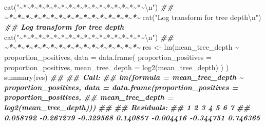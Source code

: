 \documentclass[
  11pt,
  oneside]{book}
\newenvironment{Shaded}{\begin{snugshade}}{\end{snugshade}}
\newcommand{\AttributeTok}[1]{\textcolor[rgb]{0.77,0.63,0.00}{#1}}
\newcommand{\DocumentationTok}[1]{\textcolor[rgb]{0.56,0.35,0.01}{\textbf{\textit{#1}}}}
\newcommand{\FunctionTok}[1]{\textcolor[rgb]{0.00,0.00,0.00}{#1}}
\newcommand{\NormalTok}[1]{#1}
\newcommand{\OtherTok}[1]{\textcolor[rgb]{0.56,0.35,0.01}{#1}}
\newcommand{\SpecialCharTok}[1]{\textcolor[rgb]{0.00,0.00,0.00}{#1}}
\newcommand{\StringTok}[1]{\textcolor[rgb]{0.31,0.60,0.02}{#1}}
\begin{document}
\begin{Shaded}
\begin{Highlighting}[]
\FunctionTok{cat}\NormalTok{(}\StringTok{"\textasciitilde{}*\textasciitilde{}*\textasciitilde{}*\textasciitilde{}*\textasciitilde{}*\textasciitilde{}*\textasciitilde{}*\textasciitilde{}*\textasciitilde{}*\textasciitilde{}*\textasciitilde{}*\textasciitilde{}*\textasciitilde{}*\textasciitilde{}*\textasciitilde{}*\textasciitilde{}*\textasciitilde{}}\SpecialCharTok{\textbackslash{}n}\StringTok{"}\NormalTok{)}
\DocumentationTok{\#\# \textasciitilde{}*\textasciitilde{}*\textasciitilde{}*\textasciitilde{}*\textasciitilde{}*\textasciitilde{}*\textasciitilde{}*\textasciitilde{}*\textasciitilde{}*\textasciitilde{}*\textasciitilde{}*\textasciitilde{}*\textasciitilde{}*\textasciitilde{}*\textasciitilde{}*\textasciitilde{}*\textasciitilde{}}
\FunctionTok{cat}\NormalTok{(}\StringTok{"Log transform for tree depth}\SpecialCharTok{\textbackslash{}n}\StringTok{"}\NormalTok{)}
\DocumentationTok{\#\# Log transform for tree depth}
\FunctionTok{cat}\NormalTok{(}\StringTok{"\textasciitilde{}*\textasciitilde{}*\textasciitilde{}*\textasciitilde{}*\textasciitilde{}*\textasciitilde{}*\textasciitilde{}*\textasciitilde{}*\textasciitilde{}*\textasciitilde{}*\textasciitilde{}*\textasciitilde{}*\textasciitilde{}*\textasciitilde{}*\textasciitilde{}*\textasciitilde{}*\textasciitilde{}}\SpecialCharTok{\textbackslash{}n}\StringTok{"}\NormalTok{)}
\DocumentationTok{\#\# \textasciitilde{}*\textasciitilde{}*\textasciitilde{}*\textasciitilde{}*\textasciitilde{}*\textasciitilde{}*\textasciitilde{}*\textasciitilde{}*\textasciitilde{}*\textasciitilde{}*\textasciitilde{}*\textasciitilde{}*\textasciitilde{}*\textasciitilde{}*\textasciitilde{}*\textasciitilde{}*\textasciitilde{}}
\NormalTok{res }\OtherTok{\textless{}{-}} \FunctionTok{lm}\NormalTok{(mean\_tree\_depth }\SpecialCharTok{\textasciitilde{}}\NormalTok{ proportion\_positives,}
  \AttributeTok{data =} \FunctionTok{data.frame}\NormalTok{(}
    \AttributeTok{proportion\_positives =}\NormalTok{ proportion\_positives,}
    \AttributeTok{mean\_tree\_depth =} \FunctionTok{log2}\NormalTok{(mean\_tree\_depth)}
\NormalTok{  )}
\NormalTok{)}
\FunctionTok{summary}\NormalTok{(res)}
\DocumentationTok{\#\# }
\DocumentationTok{\#\# Call:}
\DocumentationTok{\#\# lm(formula = mean\_tree\_depth \textasciitilde{} proportion\_positives, data = data.frame(proportion\_positives = proportion\_positives, }
\DocumentationTok{\#\#     mean\_tree\_depth = log2(mean\_tree\_depth)))}
\DocumentationTok{\#\# }
\DocumentationTok{\#\# Residuals:}
\DocumentationTok{\#\#         1         2         3         4         5         6         7 }
\DocumentationTok{\#\#  0.058792 {-}0.267279 {-}0.329568  0.140857 {-}0.004416 {-}0.344751  0.746365 }

\end{Highlighting}
\end{Shaded}
\end{document}
